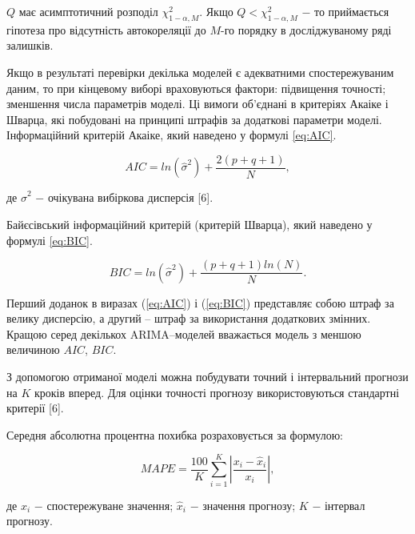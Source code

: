 \vspace{1.5em}

$Q$ має асимптотичний розподіл $\chi^{2}_{1-\alpha, M}$. Якщо $Q < \chi^{2}_{1-\alpha,M}$ $-$ то приймається гіпотеза про відсутність автокореляції до $M$-го порядку в досліджуваному ряді залишків.

Якщо в результаті перевірки декілька моделей є адекватними спостережуваним даним, то при кінцевому виборі враховуються фактори: підвищення точності; зменшення числа параметрів моделі. Ці вимоги об’єднані в критеріях Акаіке і Шварца, які побудовані на принципі штрафів за додаткові параметри моделі. Інформаційний критерій Акаіке, який наведено у формулі \ref{eq:AIC}.

\begin{equation}\label{eq:AIC}
AIC = ln(\hat{\sigma}^{2}) + \frac{2(p+q+1)}{N},
\end{equation}

\noindent де $\hat{\sigma}^{2}$ $-$ очікувана вибіркова дисперсія [6]. 

\vspace{1.5em}

Байєсівський інформаційний критерій (критерій Шварца), який наведено у формулі \ref{eq:BIC}. 

\begin{equation}\label{eq:BIC}
BIC = ln(\hat{\sigma}^{2}) + \frac{(p+q+1)ln(N)}{N}.
\end{equation}


\vspace{1.5em}

Перший доданок в виразах (\ref{eq:AIC}) і (\ref{eq:BIC}) представляє собою штраф за велику дисперсію, а другий – штраф за використання додаткових змінних. Кращою серед декількох ARIMA–моделей вважається модель з меншою величиною $AIC$, $BIC$.

З допомогою отриманої моделі можна побудувати точний і інтервальний прогнози на $K$ кроків вперед. Для оцінки точності прогнозу використовуються стандартні критерії [6].

Середня абсолютна процентна похибка розраховується за формулою:

\begin{equation}\label{eq:MAPE}
MAPE = \frac{100}{K}\sum_{i=1}^{K}\left|\frac{x_{i} - \hat{x}_{i}}{x_{i}}\right|,
\end{equation}

\noindent де $x_{i}$ $-$ спостережуване значення;\newline
\hspace*{15pt} $\hat{x}_{i}$ $-$ значення прогнозу;\newline
\hspace*{15pt} $K$ $-$ інтервал прогнозу. 

